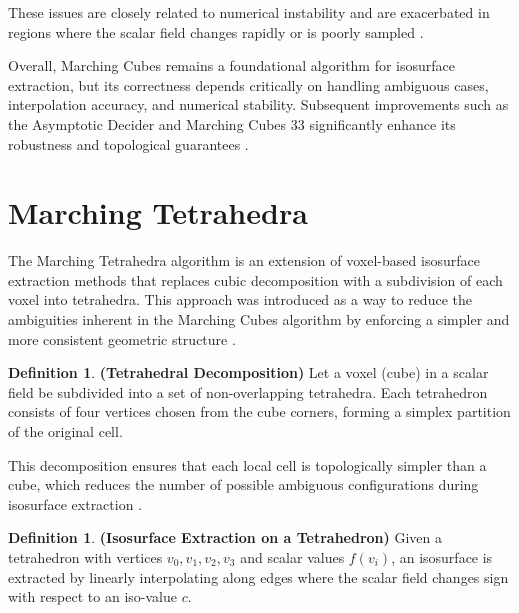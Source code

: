 \documentclass[12pt, a4paper, oneside]{book}
\theoremstyle{plain}
\theoremstyle{definition}
\newtheorem{definition}[theorem]{Definition}
\theoremstyle{remark}
\theoremstyle{definition}
\begin{document}
These issues are closely related to numerical instability and are exacerbated in regions where the scalar field changes rapidly or is poorly sampled \cite{lorensen1998marching,lewiner2003efficient}.

\vspace{0.5em}

Overall, Marching Cubes remains a foundational algorithm for isosurface extraction, but its correctness depends critically on handling ambiguous cases, interpolation accuracy, and numerical stability. Subsequent improvements such as the Asymptotic Decider and Marching Cubes 33 significantly enhance its robustness and topological guarantees \cite{lorensen1998marching,nielson1991asymptotic,chernyaev1995mc33,lewiner2003mc}.

\section{Marching Tetrahedra}

The Marching Tetrahedra algorithm is an extension of voxel-based isosurface extraction methods that replaces cubic decomposition with a subdivision of each voxel into tetrahedra. This approach was introduced as a way to reduce the ambiguities inherent in the Marching Cubes algorithm by enforcing a simpler and more consistent geometric structure \cite{shirley1990marching}.

\vspace{0.5em}

\begin{definition}
    \textbf{(Tetrahedral Decomposition)}
Let a voxel (cube) in a scalar field be subdivided into a set of non-overlapping tetrahedra. Each tetrahedron consists of four vertices chosen from the cube corners, forming a simplex partition of the original cell.
\end{definition}


This decomposition ensures that each local cell is topologically simpler than a cube, which reduces the number of possible ambiguous configurations during isosurface extraction \cite{shirley1990marching,bloomenthal1997introduction}.

\vspace{0.5em}

\begin{definition}
    \textbf{(Isosurface Extraction on a Tetrahedron)}
Given a tetrahedron with vertices $v_0, v_1, v_2, v_3$ and scalar values $f(v_i)$, an isosurface is extracted by linearly interpolating along edges where the scalar field changes sign with respect to an iso-value $c$.
\end{definition}
\end{document}
